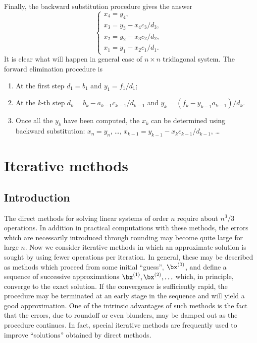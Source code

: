 %
Finally, the backward substitution procedure gives the answer
%
\begin{equation*}
  \left\{
    \begin{array}{l}
      x_4=y_4,\\
      x_3=y_3-x_4 c_3/d_3,\\
      x_2=y_2-x_3 c_2/d_2,\\
      x_1=y_1-x_2 c_1/d_1.
    \end{array} \right .
\end{equation*}
%
It is clear what will happen in general case of $n\times n$
tridiagonal system.  The forward elimination procedure is

\begin{enumerate}
\item At the first step $d_1=b_1$ and $y_1=f_1/d_1$;
\item At the $k$-th step $d_k=b_k-a_{k-1}c_{k-1}/d_{k-1}$ and
  $y_k=(f_k-y_{k-1} a_{k-1})/d_k$. 
%
\item Once all the $y_k$ have been computed, the $x_k$ can be
  determined using backward substitution: $x_n = y_n$, \ldots,
  $x_{k-1}=y_{k-1}-x_k c_{k-1}/d_{k-1}$, \ldots
\end{enumerate}

\section{Iterative methods}

\subsection{Introduction}

The direct methods for solving linear systems of order $n$ require
about $n^3/3$ operations.   In addition in practical computations with
these methods, the errors which are necessarily introduced through
rounding may become quite large for large $n$.   Now we consider
iterative methods in which an approximate solution is sought by using
fewer operations per iteration.   In general, these may be described
as methods which proceed from some initial ``guess'', $\bx^{(0)}$, and
define a sequence of successive approximations $\bx^{(1)}, \bx^{(2)},
\ldots$ which, in principle, converge to the exact solution.    If the
convergence is sufficiently rapid, the procedure may be terminated at
an early stage in the sequence and will yield a good approximation.
One of the intrinsic advantages of such methods is the fact that the
errors, due to roundoff or even blunders, may be damped out as the
procedure continues.   In fact, special iterative methods are
frequently used to improve ``solutions'' obtained by direct methods.

